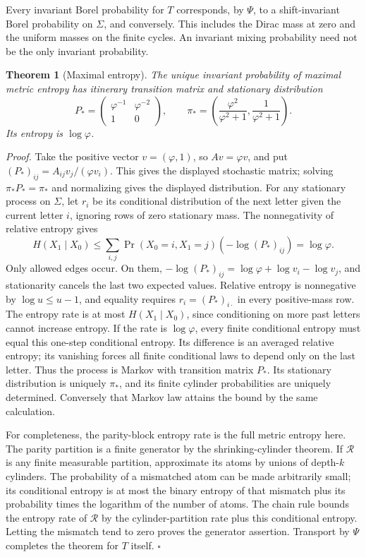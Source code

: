 \documentclass[11pt,letterpaper]{article}
\newtheorem{theorem}{Theorem}
\newenvironment{proof}{\noindent\textit{Proof.}}{\hfill\(\square\)}
\begin{document}
Every invariant Borel probability for \(T\) corresponds, by \(\Psi\),
to a shift-invariant Borel probability on \(\Sigma\), and conversely.
This includes the Dirac mass at zero and the uniform masses on the
finite cycles. An invariant mixing probability need not be the only
invariant probability.

\begin{theorem}[Maximal entropy]
\label{thm:maximal}
The unique invariant probability of maximal metric entropy has itinerary
transition matrix and stationary distribution
\[
P_*=
\begin{pmatrix}\varphi^{-1}&\varphi^{-2}\\1&0\end{pmatrix},
\qquad
\pi_*=\left(\frac{\varphi^2}{\varphi^2+1},
\frac1{\varphi^2+1}\right).
\]
Its entropy is \(\log\varphi\).
\end{theorem}

\begin{proof}
Take the positive vector \(v=(\varphi,1)\), so \(Av=\varphi v\),
and put \((P_*)_{ij}=A_{ij}v_j/(\varphi v_i)\).
This gives the displayed stochastic matrix; solving \(\pi_*P_*=\pi_*\)
and normalizing gives the displayed distribution.
For any stationary process on \(\Sigma\), let \(r_i\) be its
conditional distribution of the next letter given the current letter
\(i\), ignoring rows of zero stationary mass. The nonnegativity of
relative entropy gives
\[
H(X_1\mid X_0)\le
\sum_{i,j}\Pr(X_0=i,X_1=j)(-\log(P_*)_{ij})
=\log\varphi.
\]
Only allowed edges occur. On them,
\(-\log(P_*)_{ij}=\log\varphi+\log v_i-\log v_j\),
and stationarity cancels the last two expected values.
Relative entropy is nonnegative by \(\log u\le u-1\), and equality
requires \(r_i=(P_*)_{i\cdot}\) in every positive-mass row.
The entropy rate is at most \(H(X_1\mid X_0)\), since conditioning
on more past letters cannot increase entropy. If the rate is
\(\log\varphi\), every finite conditional entropy must equal this
one-step conditional entropy. Its difference is an averaged relative
entropy; its vanishing forces all finite conditional laws to depend
only on the last letter. Thus the process is Markov with transition
matrix \(P_*\). Its stationary distribution is uniquely \(\pi_*\),
and its finite cylinder probabilities are uniquely determined.
Conversely that Markov law attains the bound by the same calculation.

For completeness, the parity-block entropy rate is the full metric
entropy here. The parity partition is a finite generator by the
shrinking-cylinder theorem. If \(\mathcal R\) is any finite measurable
partition, approximate its atoms by unions of depth-\(k\) cylinders.
The probability of a mismatched atom can be made arbitrarily small;
its conditional entropy is at most the binary entropy of that mismatch
plus its probability times the logarithm of the number of atoms.
The chain rule bounds the entropy rate of \(\mathcal R\) by the
cylinder-partition rate plus this conditional entropy. Letting the
mismatch tend to zero proves the generator assertion. Transport by
\(\Psi\) completes the theorem for \(T\) itself.
\end{proof}
\end{document}
